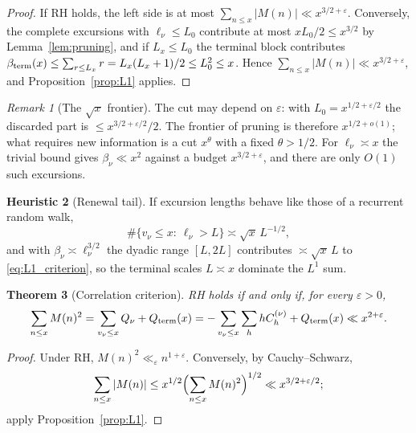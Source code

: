 \documentclass[11pt]{amsart}
\numberwithin{equation}{section}
\theoremstyle{plain}
\newtheorem{theorem}{Theorem}[section]
\theoremstyle{definition}
\newtheorem{heuristic}[theorem]{Heuristic}
\theoremstyle{remark}
\newtheorem{remark}[theorem]{Remark}
\newcommand{\eps}{\varepsilon}
\begin{document}
\begin{proof}
If RH holds, the left side is at most $\sum_{n\le x}|M(n)|\ll x^{3/2+\eps}$.
Conversely, the complete excursions with $\ell_\nu\le L_0$ contribute at
most $xL_0/2\le x^{3/2}$ by Lemma~\ref{lem:pruning}, and if $L_x\le L_0$
the terminal block contributes
$\beta_{\rm term}(x)\le\sum_{r\le L_x}r=L_x(L_x+1)/2\le L_0^2\le x$.
Hence $\sum_{n\le x}|M(n)|\ll x^{3/2+\eps}$, and
Proposition~\ref{prop:L1} applies.
\end{proof}

\begin{remark}[The $\sqrt{x}$ frontier]
\label{rem:sqrt_frontier}
The cut may depend on $\eps$: with $L_0=x^{1/2+\eps/2}$ the discarded part is
$\le x^{3/2+\eps/2}/2$. The frontier of pruning is therefore $x^{1/2+o(1)}$;
what requires new information is a cut $x^{\theta}$ with a fixed
$\theta>1/2$. For $\ell_\nu\asymp x$ the trivial bound gives
$\beta_\nu\ll x^2$ against a budget $x^{3/2+\eps}$, and there are only
$O(1)$ such excursions.
\end{remark}

\begin{heuristic}[Renewal tail]
\label{heu:renewal}
If excursion lengths behave like those of a recurrent random walk,
\begin{equation}
\label{eq:renewal_tail}
  \#\{v_\nu\le x:\ \ell_\nu>L\}\asymp\sqrt{x}\,L^{-1/2},
\end{equation}
and with $\beta_\nu\asymp\ell_\nu^{3/2}$ the dyadic range $[L,2L]$
contributes $\asymp\sqrt{x}\,L$ to \eqref{eq:L1_criterion}, so the terminal
scales $L\asymp x$ dominate the $L^1$ sum.
\end{heuristic}

\begin{theorem}[Correlation criterion]
\label{thm:corr-criterion}
RH holds if and only if, for every $\eps>0$,
\begin{equation}
\label{eq:RH-corr}
  \sum_{n\le x}M(n)^2=\sum_{v_\nu\le x}Q_\nu+Q_{\rm term}(x)
  =-\sum_{v_\nu\le x}\sum_{h}hC^{(\nu)}_h+Q_{\rm term}(x)\ll x^{2+\eps}.
\end{equation}
\end{theorem}

\begin{proof}
Under RH, $M(n)^2\ll_\eps n^{1+\eps}$. Conversely, by Cauchy--Schwarz,
\[
\sum_{n\le x}|M(n)|\le x^{1/2}\Bigl(\sum_{n\le x}M(n)^2\Bigr)^{1/2}\ll x^{3/2+\eps/2};
\]
apply
Proposition~\ref{prop:L1}.
\end{proof}
\end{document}
